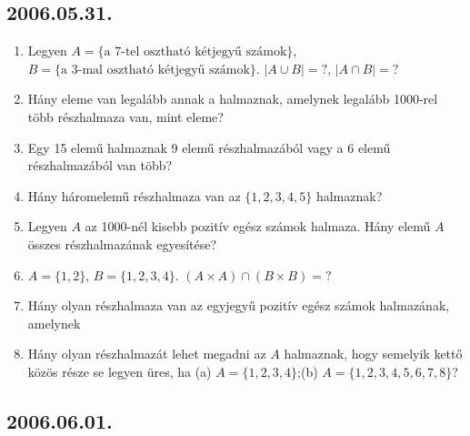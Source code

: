 \subsection*{2006.05.31.}
\begin{enumerate}
\item Legyen $A=\{\text{a 7-tel osztható kétjegyű számok}\}$,
$B=\{\text{a 3-mal osztható kétjegyű számok}\}$. $|A\cup B|=?$, $|A\cap B|=?$
\item Hány eleme van legalább annak a halmaznak, amelynek legalább 1000-rel több részhalmaza van, mint eleme?
\item Egy 15 elemű halmaznak 9 elemű részhalmazából vagy a 6 elemű részhalmazából van több?
\item Hány háromelemű részhalmaza van az $\{1,2,3,4,5\}$ halmaznak?
\item Legyen $A$ az 1000-nél kisebb pozitív egész számok halmaza. Hány elemű $A$ összes részhalmazának egyesítése?
\item $A=\{1,2\}$, $B=\{1,2,3,4\}$. $(A\times A)\cap(B\times B)=?$
\item Hány olyan részhalmaza van az egyjegyű pozitív egész számok halmazának, amelynek
\item Hány olyan részhalmazát lehet megadni az $A$ halmaznak, hogy semelyik kettő közös része se legyen üres, ha
(a) $A=\{1,2,3,4\}$;\quad (b) $A=\{1,2,3,4,5,6,7,8\}$?
\end{enumerate}

\subsection*{2006.06.01.}

